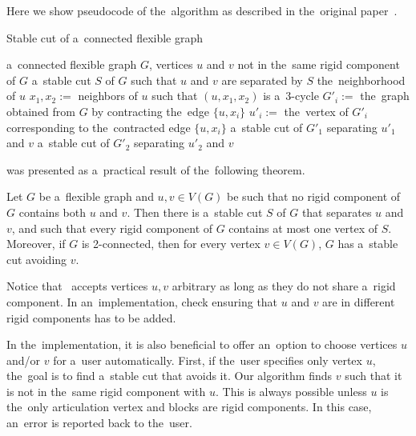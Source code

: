 Here we show pseudocode of the~algorithm as described
in the~original paper~\cite{stable_cuts_legersky}.
%
\begin{algorithm}[ht]
	\caption{Stable cut of a~connected flexible graph}%
	\label{alg:stable_cut_flexible}%
	\begin{algorithmic}[1]
		\Require{} a~connected flexible graph $G$, vertices $u$ and $v$ not in the~same rigid component of $G$
		\Ensure{} a~stable cut $S$ of $G$ such that $u$ and $v$ are separated by $S$
		\State\Return{} the~neighborhood of $u$
		\Else{}
		\State{} $x_1,x_2 :={}$ neighbors of $u$ such that $(u,x_1,x_2)$  is a~$3$-cycle
		\State{} $G'_i :={}$ the~graph obtained from $G$ by contracting the~edge $\{u, x_i\}$
		\State{} $u'_i :={}$ the~vertex of $G'_i$ corresponding to the~contracted edge $\{u, x_i\}$
		\EndFor{}
		\State\Return{} a~stable cut of $G'_1$ separating $u'_1$ and $v$
		\Else{}
		\State\Return{} a~stable cut of $G'_2$ separating $u'_2$ and $v$
		\EndIf{}
		\EndIf{}
	\end{algorithmic}
\end{algorithm}
%

was presented as a~practical result of the~following theorem.
%
\begin{theorem}
	Let \( G \) be a~flexible graph and \( u, v \in V (G) \) be such that no rigid component of \( G \)
	contains both \( u \) and \( v \). Then there is a~stable cut \( S \) of \( G \) that separates \( u \) and \( v \), and such that
	every rigid component of \( G \) contains at most one vertex of \( S \). Moreover, if \( G \) is 2-connected,
	then for every vertex \( v \in V(G) \), \( G \) has a~stable cut avoiding \( v \).
\end{theorem}
%

Notice that~
accepts vertices \( u, v \) arbitrary as long as they do not share a~rigid component.
In an~implementation, check ensuring that \( u \) and \( v \)
are in different rigid components has to be added.

In the~implementation, it is also beneficial to offer an~option to choose
vertices \( u \) and/or \(  v \) for a~user automatically.
First, if the~user specifies only vertex \( u \), the~goal is to find a~stable cut
that avoids it. Our algorithm finds \( v \)
such that it is not in the~same rigid component with \( u \).
This is always possible unless \( u \) is the~only articulation vertex
and blocks are rigid components. In this case, an~error is reported back to the~user.

